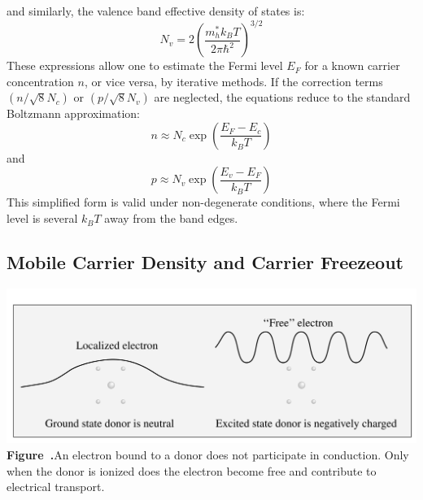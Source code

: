 \noindent
and similarly, the valence band effective density of states is:
\begin{equation*}
	N_v = 2 \left( \frac{m_h^* k_B T}{2\pi \hbar^2} \right)^{3/2}
\end{equation*}
These expressions allow one to estimate the Fermi level \( E_F \) for a known carrier concentration \( n \), or vice versa, by iterative methods. If the correction terms \( (n/\sqrt{8}N_c) \) or \( (p/\sqrt{8}N_v) \) are neglected, the equations reduce to the standard Boltzmann approximation:
\begin{equation}
	n \approx N_c \exp \left( \frac{E_F - E_c}{k_B T} \right)
\end{equation}
\noindent
and
\begin{equation}
	p \approx N_v \exp \left( \frac{E_v - E_F}{k_B T} \right)
\end{equation}
This simplified form is valid under non-degenerate conditions, where the Fermi level is several \( k_B T \) away from the band edges.

\subsection{Mobile Carrier Density and Carrier Freezeout}
\begin{center}
	\begin{minipage}{0.7\textwidth}
		\centering
		\includegraphics[width=\textwidth]{img/Electron_band.png}
		\\[0.5em]
		\textbf{Figure~\thefigure.}An electron bound to a donor does not participate in conduction. Only when the donor is ionized does the electron become free and contribute to electrical transport.
		\label{fig:Electron_band}
	\end{minipage}
\end{center}

